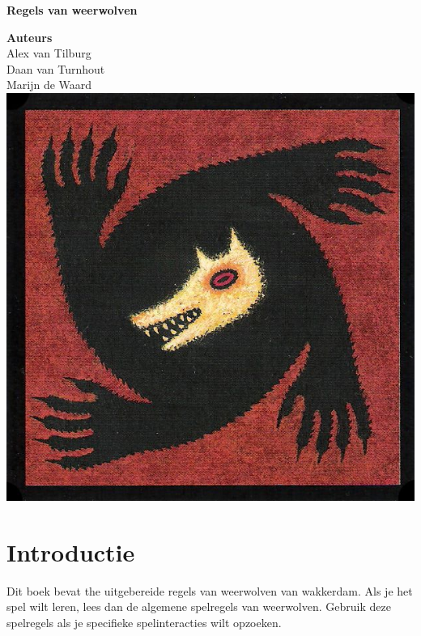 \documentclass{article}
\begin{document}
\begin{titlepage}
    \begin{center}
        \Huge
        \textbf{Regels van weerwolven}

        \vspace{1cm}
        \textbf{Auteurs} \\
        \vspace{0.5cm}
        \Large
        Alex van Tilburg \\
        Daan van Turnhout \\
        Marijn de Waard \\

        \vfill
        \includegraphics[scale=0.7]{logo.jpg}
        \vfill
    \end{center}
\end{titlepage}

\sffamily

\section*{Introductie}
Dit boek bevat the uitgebereide regels van weerwolven van wakkerdam.
Als je het spel wilt leren, lees dan de algemene spelregels van weerwolven.
Gebruik deze spelregels als je specifieke spelinteracties wilt opzoeken.
\end{document}
